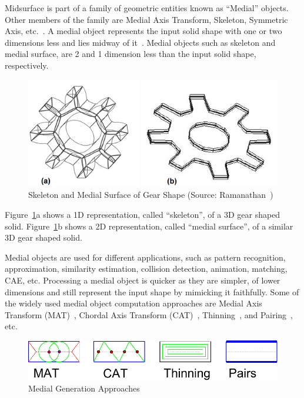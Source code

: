 Midsurface is part of a family of geometric entities known as ``Medial'' objects. Other members of the family are Medial Axis Transform, Skeleton, Symmetric Axis, etc.~\cite{Butlin2009}. A medial object represents the input solid shape with one or two dimensions less and lies midway of it~\cite{Armstrong}.  Medial objects such as skeleton and medial surface, are 2 and 1 dimension less than the input solid shape, respectively.


	\begin{figure} [h]
		\centering
		\includegraphics[width=0.7\linewidth]{images/mat2d3d}
		\caption{Skeleton and Medial Surface of Gear Shape (Source: Ramanathan~\cite{Ramanathan2004, Ramanathan2005})}
		\label{fig:litsurvey:mat2d3d}
	\end{figure}
	

Figure~\ref{fig:litsurvey:mat2d3d}a shows a 1D representation, called ``skeleton'', of a 3D gear shaped solid. Figure~\ref{fig:litsurvey:mat2d3d}b shows a 2D representation, called ``medial surface'', of a similar 3D gear shaped solid. 

Medial objects are used for different applications, such as pattern recognition, approximation, similarity estimation, collision detection, animation, matching, CAE, etc. Processing a medial object is quicker as they are simpler, of lower dimensions and still represent the input shape by mimicking it faithfully. Some of the widely used medial object computation approaches are Medial Axis Transform (MAT)~\cite{Harry1967},  Chordal Axis Transform (CAT)~\cite{Prasad2007}, Thinning~\cite{Lam1992}, and Pairing~\cite{Rezayat1996}, etc.  



	\begin{figure} [h]
		\centering
		\includegraphics[width=0.7\linewidth]{images/MedialMethodsOnlyShort_1.pdf}
		\caption{Medial Generation Approaches}
		\label{fig:litsurvey:medials}
	\end{figure}
	

